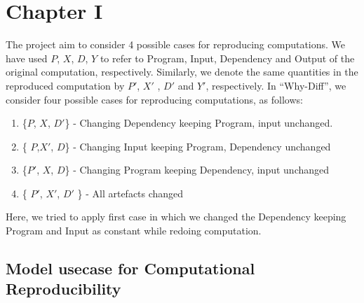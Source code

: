 \documentclass[10pt,conference,twocolumn]{IEEEtran}
\begin{document}
\section{Chapter I}
The project aim to consider 4 possible cases for reproducing computations. We have used $P$, $X$, $D$, $Y$ to refer to Program, Input, Dependency and Output of the original computation, respectively. 
Similarly, we denote the same quantities in the reproduced computation by  $P'$, $X'$ , $D'$ and $Y'$, respectively.
\newline
In \enquote{Why-Diff}, we consider four possible cases for reproducing computations, as follows:
\begin{enumerate} \label{data}
       \item \{$P$, $X$, $D'$\} - Changing Dependency keeping Program, input unchanged. 
        \item \{ $P$,$X'$, $D$\} - Changing Input keeping Program, Dependency unchanged
          \item \{$P'$, $X$, $D$\}  - Changing Program keeping Dependency, input unchanged
          \item \{ $P'$, $X'$, $D'$ \}  - All artefacts changed
\end{enumerate}

Here, we tried to apply first case in which we changed the Dependency keeping Program and Input as constant while redoing computation. 
\subsection{Model usecase for Computational Reproducibility}
\end{document}
